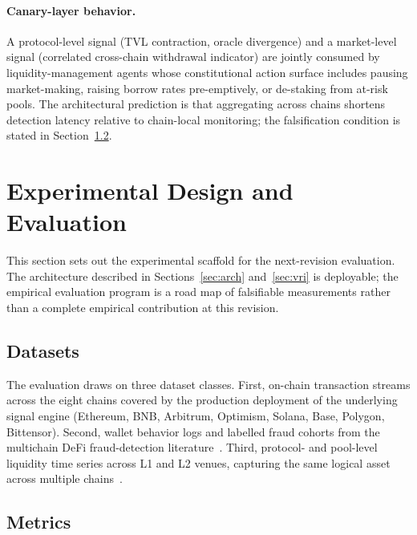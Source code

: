 \documentclass[journal]{IEEEtran}
\begin{document}
\paragraph*{Canary-layer behavior.}
A protocol-level signal (TVL contraction, oracle divergence) and a
market-level signal (correlated cross-chain withdrawal indicator) are
jointly consumed by liquidity-management agents whose constitutional
action surface includes pausing market-making, raising borrow rates
pre-emptively, or de-staking from at-risk pools. The architectural
prediction is that aggregating across chains shortens detection
latency relative to chain-local monitoring; the falsification condition
is stated in Section~\ref{sec:eval:metrics}.

\section{Experimental Design and Evaluation}\label{sec:eval}

This section sets out the experimental scaffold for the next-revision
evaluation. The architecture described in Sections~\ref{sec:arch}
and~\ref{sec:vri} is deployable; the empirical evaluation program is
a road map of falsifiable measurements rather than a complete
empirical contribution at this revision.

\subsection{Datasets}

The evaluation draws on three dataset classes.
First, on-chain transaction streams across the eight chains covered by
the production deployment of the underlying signal engine
(Ethereum, BNB, Arbitrum, Optimism, Solana, Base, Polygon, Bittensor).
Second, wallet behavior logs and labelled fraud cohorts from the
multichain DeFi fraud-detection
literature~\cite{palaiokrassas2023multichain,bhowmik2021,FanLZJB20}.
Third, protocol- and pool-level liquidity time series across L1 and
L2 venues, capturing the same logical asset across multiple
chains~\cite{gogol2024liquidity}.

\subsection{Metrics}\label{sec:eval:metrics}
\end{document}
